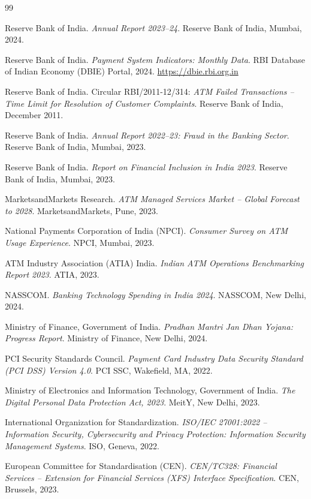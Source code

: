 \documentclass[12pt,a4paper]{article}
\begin{document}
\begin{thebibliography}{99}

Reserve Bank of India.
\textit{Annual Report 2023--24}.
Reserve Bank of India, Mumbai, 2024.

Reserve Bank of India.
\textit{Payment System Indicators: Monthly Data}.
RBI Database of Indian Economy (DBIE) Portal, 2024.
\url{https://dbie.rbi.org.in}

Reserve Bank of India.
Circular RBI/2011-12/314: \textit{ATM Failed Transactions -- Time Limit for Resolution of
Customer Complaints}.
Reserve Bank of India, December 2011.

Reserve Bank of India.
\textit{Annual Report 2022--23: Fraud in the Banking Sector}.
Reserve Bank of India, Mumbai, 2023.

Reserve Bank of India.
\textit{Report on Financial Inclusion in India 2023}.
Reserve Bank of India, Mumbai, 2023.

MarketsandMarkets Research.
\textit{ATM Managed Services Market -- Global Forecast to 2028}.
MarketsandMarkets, Pune, 2023.

National Payments Corporation of India (NPCI).
\textit{Consumer Survey on ATM Usage Experience}.
NPCI, Mumbai, 2023.

ATM Industry Association (ATIA) India.
\textit{Indian ATM Operations Benchmarking Report 2023}.
ATIA, 2023.

NASSCOM.
\textit{Banking Technology Spending in India 2024}.
NASSCOM, New Delhi, 2024.

Ministry of Finance, Government of India.
\textit{Pradhan Mantri Jan Dhan Yojana: Progress Report}.
Ministry of Finance, New Delhi, 2024.

PCI Security Standards Council.
\textit{Payment Card Industry Data Security Standard (PCI DSS) Version 4.0}.
PCI SSC, Wakefield, MA, 2022.

Ministry of Electronics and Information Technology, Government of India.
\textit{The Digital Personal Data Protection Act, 2023}.
MeitY, New Delhi, 2023.

International Organization for Standardization.
\textit{ISO/IEC 27001:2022 -- Information Security, Cybersecurity and Privacy Protection:
Information Security Management Systems}.
ISO, Geneva, 2022.

European Committee for Standardisation (CEN).
\textit{CEN/TC328: Financial Services -- Extension for Financial Services (XFS) Interface
Specification}.
CEN, Brussels, 2023.

\end{thebibliography}
\end{document}

